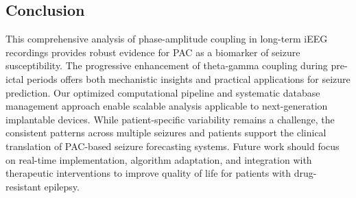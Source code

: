 \subsection{Conclusion}
This comprehensive analysis of phase-amplitude coupling in long-term iEEG recordings provides robust evidence for PAC as a biomarker of seizure susceptibility. The progressive enhancement of theta-gamma coupling during pre-ictal periods offers both mechanistic insights and practical applications for seizure prediction. Our optimized computational pipeline and systematic database management approach enable scalable analysis applicable to next-generation implantable devices. While patient-specific variability remains a challenge, the consistent patterns across multiple seizures and patients support the clinical translation of PAC-based seizure forecasting systems. Future work should focus on real-time implementation, algorithm adaptation, and integration with therapeutic interventions to improve quality of life for patients with drug-resistant epilepsy.

\label{sec:discussion}